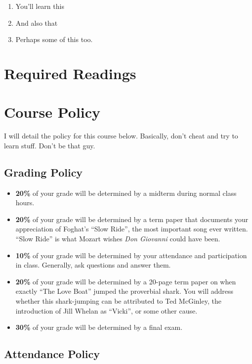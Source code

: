 \documentclass[11pt,]{article}
\begin{document}
\begin{enumerate}
\def\labelenumi{\arabic{enumi}.}
\item
  You'll learn this
\item
  And also that
\item
  Perhaps some of this too.
\end{enumerate}

\section{Required Readings}\label{required-readings}

\section{Course Policy}\label{course-policy}

I will detail the policy for this course below. Basically, don't cheat
and try to learn stuff. Don't be that guy.

\subsection{Grading Policy}\label{grading-policy}

\begin{itemize}
\item
  \textbf{20\%} of your grade will be determined by a midterm during
  normal class hours.
\item
  \textbf{20\%} of your grade will be determined by a term paper that
  documents your appreciation of Foghat's ``Slow Ride'', the most
  important song ever written. ``Slow Ride'' is what Mozart wishes
  \emph{Don Giovanni} could have been.
\item
  \textbf{10\%} of your grade will be determined by your attendance and
  participation in class. Generally, ask questions and answer them.
\item
  \textbf{20\%} of your grade will be determined by a 20-page term paper
  on when exactly ``The Love Boat'' jumped the proverbial shark. You
  will address whether this shark-jumping can be attributed to Ted
  McGinley, the introduction of Jill Whelan as ``Vicki'', or some other
  cause.
\item
  \textbf{30\%} of your grade will be determined by a final exam.
\end{itemize}

\subsection{Attendance Policy}\label{attendance-policy}
\end{document}
